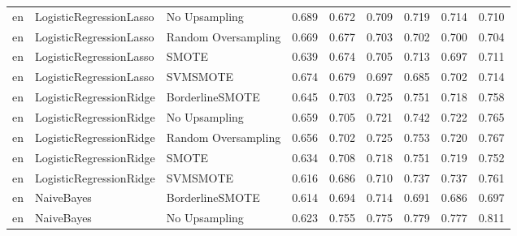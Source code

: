 \begin{tabular}{lllllllll}
      en &      LogisticRegressionLasso &       No Upsampling & 0.689 &                     0.672 &                 0.709 &                  0.719 &                                   0.714 &     0.710 \\
      en &      LogisticRegressionLasso & Random Oversampling & 0.669 &                     0.677 &                 0.703 &                  0.702 &                                   0.700 &     0.704 \\
      en &      LogisticRegressionLasso &               SMOTE & 0.639 &                     0.674 &                 0.705 &                  0.713 &                                   0.697 &     0.711 \\
      en &      LogisticRegressionLasso &            SVMSMOTE & 0.674 &                     0.679 &                 0.697 &                  0.685 &                                   0.702 &     0.714 \\
      en &      LogisticRegressionRidge &     BorderlineSMOTE & 0.645 &                     0.703 &                 0.725 &                  0.751 &                                   0.718 &     0.758 \\
      en &      LogisticRegressionRidge &       No Upsampling & 0.659 &                     0.705 &                 0.721 &                  0.742 &                                   0.722 &     0.765 \\
      en &      LogisticRegressionRidge & Random Oversampling & 0.656 &                     0.702 &                 0.725 &                  0.753 &                                   0.720 &     0.767 \\
      en &      LogisticRegressionRidge &               SMOTE & 0.634 &                     0.708 &                 0.718 &                  0.751 &                                   0.719 &     0.752 \\
      en &      LogisticRegressionRidge &            SVMSMOTE & 0.616 &                     0.686 &                 0.710 &                  0.737 &                                   0.737 &     0.761 \\
      en &                   NaiveBayes &     BorderlineSMOTE & 0.614 &                     0.694 &                 0.714 &                  0.691 &                                   0.686 &     0.697 \\
      en &                   NaiveBayes &       No Upsampling & 0.623 &                     0.755 &                 0.775 &                  0.779 &                                   0.777 &     0.811 \\

\end{tabular}
